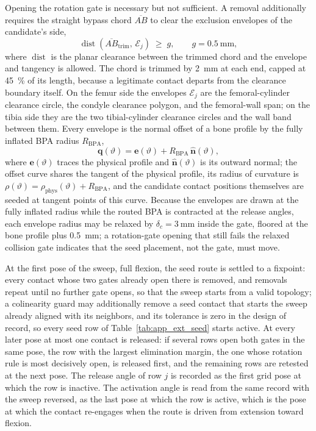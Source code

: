 Opening the rotation gate is necessary but not sufficient. A removal additionally requires the straight bypass chord $\overline{AB}$ to clear the exclusion envelopes of the candidate's side,
\begin{equation}
\operatorname{dist}\!\left(\overline{AB}_{\mathrm{trim}},\, \mathcal{E}_{j}\right) \;\geq\; g, \qquad g = \qty{0.5}{\mm},
\label{eq:app_bypass_gate}
\end{equation}
where $\operatorname{dist}$ is the planar clearance between the trimmed chord and the envelope and tangency is allowed. The chord is trimmed by \qty{2}{\mm} at each end, capped at \qty{45}{\percent} of its length, because a legitimate contact departs from the clearance boundary itself. On the femur side the envelopes $\mathcal{E}_{j}$ are the femoral-cylinder clearance circle, the condyle clearance polygon, and the femoral-wall span; on the tibia side they are the two tibial-cylinder clearance circles and the wall band between them. Every envelope is the normal offset of a bone profile by the fully inflated BPA radius $R_{\mathrm{BPA}}$,
\begin{equation}
\mathbf{q}(\vartheta) = \mathbf{e}(\vartheta) + R_{\mathrm{BPA}}\,\hat{\mathbf{n}}(\vartheta),
\label{eq:app_offset_curve}
\end{equation}
where $\mathbf{e}(\vartheta)$ traces the physical profile and $\hat{\mathbf{n}}(\vartheta)$ is its outward normal; the offset curve shares the tangent of the physical profile, its radius of curvature is $\rho(\vartheta) = \rho_{\mathrm{phys}}(\vartheta) + R_{\mathrm{BPA}}$, and the candidate contact positions themselves are seeded at tangent points of this curve. Because the envelopes are drawn at the fully inflated radius while the routed BPA is contracted at the release angles, each envelope radius may be relaxed by $\delta_c = \qty{3}{\mm}$ inside the gate, floored at the bone profile plus \qty{0.5}{\mm}; a rotation-gate opening that still fails the relaxed collision gate indicates that the seed placement, not the gate, must move.

At the first pose of the sweep, full flexion, the seed route is settled to a fixpoint: every contact whose two gates already open there is removed, and removals repeat until no further gate opens, so that the sweep starts from a valid topology; a colinearity guard may additionally remove a seed contact that starts the sweep already aligned with its neighbors, and its tolerance is zero in the design of record, so every seed row of Table~\ref{tab:app_ext_seed} starts active. At every later pose at most one contact is released: if several rows open both gates in the same pose, the row with the largest elimination margin, the one whose rotation rule is most decisively open, is released first, and the remaining rows are retested at the next pose. The release angle of row $j$ is recorded as the first grid pose at which the row is inactive. The activation angle is read from the same record with the sweep reversed, as the last pose at which the row is active, which is the pose at which the contact re-engages when the route is driven from extension toward flexion.

